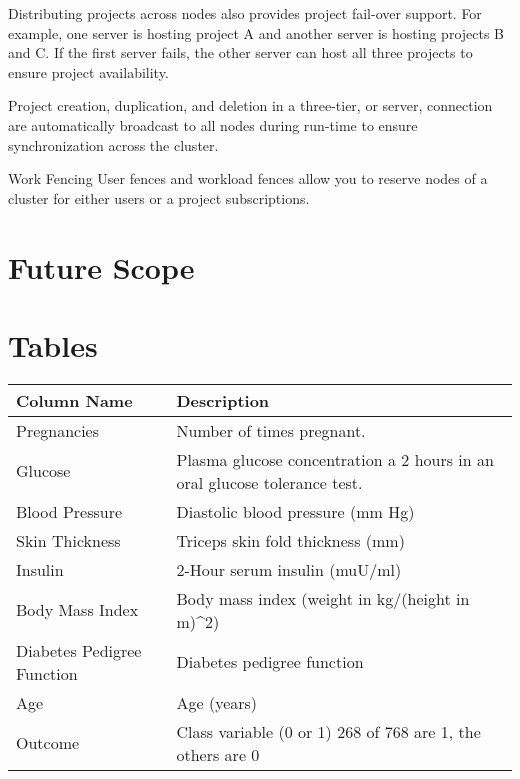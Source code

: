 \documentclass[12pt]{article}
\begin{document}
Distributing projects across nodes also provides project fail-over support. For example, one server is hosting project A and another server is hosting projects B and C. If the first server fails, the other server can host all three projects to ensure project availability.

Project creation, duplication, and deletion in a three-tier, or server, connection are automatically broadcast to all nodes during run-time to ensure synchronization across the cluster.

Work Fencing
User fences and workload fences allow you to reserve nodes of a cluster for either users or a project subscriptions. 

\newpage
\section{Future Scope}

\newpage
\section{Tables}
{
\clearpage
\thispagestyle{empty}
\begin{landscape}
\centering
\begin{table}[]
\centering
\begin{tabular}{|l|l|}
\hline
Column Name                & Description                                                               \\ \hline
Pregnancies                & Number of times pregnant.                                                 \\ \hline
Glucose                    & Plasma glucose concentration a 2 hours in an oral glucose tolerance test. \\ \hline
Blood Pressure             & Diastolic blood pressure (mm Hg)                                          \\ \hline
Skin Thickness             & Triceps skin fold thickness (mm)                                          \\ \hline
Insulin                    & 2-Hour serum insulin (muU/ml)                                            \\ \hline
Body Mass Index            & Body mass index (weight in kg/(height in m)\textasciicircum{}2)           \\ \hline
Diabetes Pedigree Function & Diabetes pedigree function                                                \\ \hline
Age                        & Age (years)                                                               \\ \hline
Outcome                    & Class variable (0 or 1) 268 of 768 are 1, the others are 0                \\ \hline
\end{tabular}
\end{table}
\label{table:1}
\end{landscape}
\clearpage
}
\end{document}
